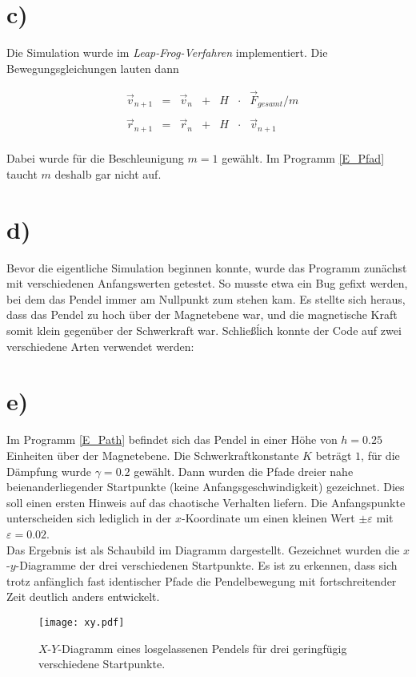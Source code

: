 \section*{c)}
Die Simulation wurde im \textit{Leap-Frog-Verfahren} implementiert. Die Bewegungsgleichungen lauten dann

\begin{align}
&\vec{v}_{n+1} &= &\vec{v}_n &+ &H &\cdot &\vec{F}_{gesamt} / m \\\\
&\vec{r}_{n+1} &= &\vec{r}_n &+ &H &\cdot &\vec{v}_{n+1}
\end{align}
\\
Dabei wurde für die Beschleunigung $m=1$ gewählt. Im Programm \ref{E_Pfad} taucht $m$ deshalb gar nicht auf.

\section*{d)}
Bevor die eigentliche Simulation beginnen konnte, wurde das Programm zunächst mit verschiedenen Anfangswerten getestet. So musste etwa ein Bug gefixt werden, bei dem das Pendel immer am Nullpunkt zum stehen kam. Es stellte sich heraus, dass das Pendel zu hoch über der Magnetebene war, und die magnetische Kraft somit klein gegenüber der Schwerkraft war. Schließĺich konnte der Code auf zwei verschiedene Arten verwendet werden:

\section{e)}
Im Programm \ref{E_Path} befindet sich das Pendel in einer Höhe von $h=0.25$ Einheiten über der Magnetebene. Die Schwerkraftkonstante $K$ beträgt $1$, für die Dämpfung wurde $\gamma = 0.2$ gewählt. Dann wurden die Pfade dreier nahe beienanderliegender Startpunkte (keine Anfangsgeschwindigkeit) gezeichnet. Dies soll einen ersten Hinweis auf das chaotische Verhalten liefern. Die Anfangspunkte unterscheiden sich lediglich in der $x$-Koordinate um einen kleinen Wert $\pm \varepsilon$ mit $\varepsilon = 0.02$.\\
Das Ergebnis ist als Schaubild im Diagramm \label{fig:xy} dargestellt. Gezeichnet wurden die $x$-$y$-Diagramme der drei verschiedenen Startpunkte. Es ist zu erkennen, dass sich trotz anfänglich fast identischer Pfade die Pendelbewegung mit fortschreitender Zeit deutlich anders entwickelt.

\begin{figure}[t]
	\centering
	\texttt{[image: xy.pdf]}
	\caption{$X$-$Y$-Diagramm eines losgelassenen Pendels für drei geringfügig verschiedene Startpunkte.}
	\label{fig:xy}
\end{figure}


